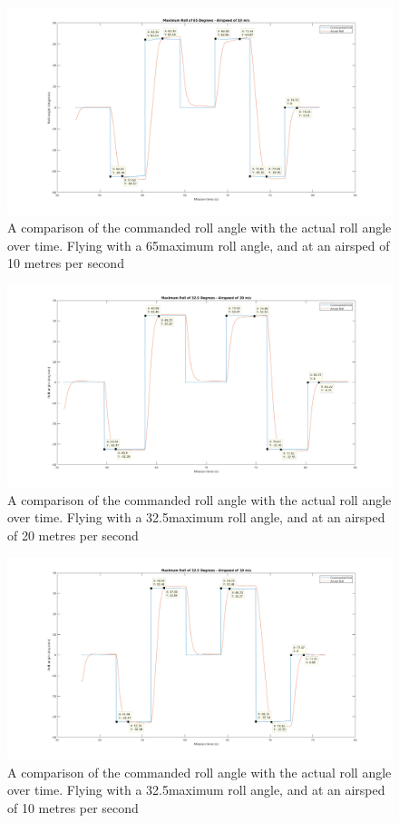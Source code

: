 \begin{figure} 
\centering    
\includegraphics[scale=0.5]{65_10_cursors}
\caption{A comparison of the commanded roll angle with the actual roll angle over time. Flying with a 65\degree  maximum roll angle, and at an airsped of 10 metres per second}
\end{figure}

\begin{figure} 
\centering    
\includegraphics[scale=0.5]{32_20_cursors}
\caption{A comparison of the commanded roll angle with the actual roll angle over time. Flying with a 32.5\degree  maximum roll angle, and at an airsped of 20 metres per second}
\end{figure}

\begin{figure} 
\centering    
\includegraphics[scale=0.5]{32_10_cursors}
\caption{A comparison of the commanded roll angle with the actual roll angle over time. Flying with a 32.5\degree  maximum roll angle, and at an airsped of 10 metres per second}
\end{figure}